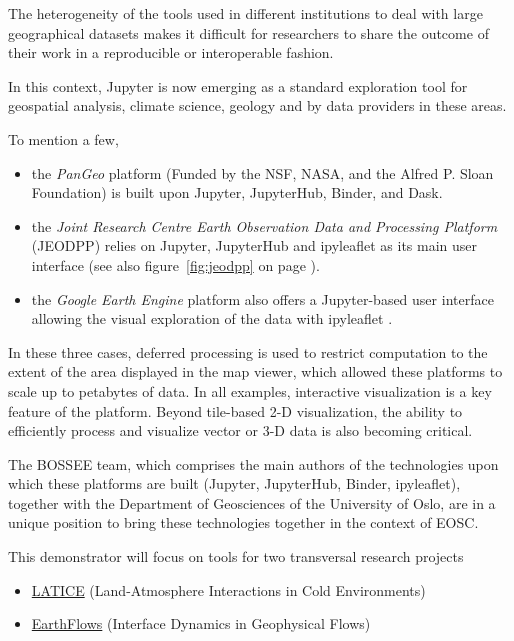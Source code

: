The heterogeneity of the tools used in different institutions to deal with
large geographical datasets makes it difficult for researchers to share the outcome
of their work in a reproducible or interoperable fashion.

In this context, Jupyter is now emerging as a standard exploration tool for
geospatial analysis, climate science, geology and by data providers in these areas.

To mention a few,
\begin{itemize}
\item
   the \emph{PanGeo} platform \cite{Pangeo2018} (Funded by the NSF, NASA, and the
   Alfred P. Sloan Foundation) is built upon Jupyter, JupyterHub, Binder, and Dask.
\item
   the \emph{Joint Research Centre Earth Observation Data and Processing Platform}
   (JEODPP) \cite{Soille2018} relies on Jupyter, JupyterHub and ipyleaflet as
   its main user interface (see also figure~\ref{fig:jeodpp} on page \pageref{fig:jeodpp}).
\item
   the \emph{Google Earth Engine} platform also offers a Jupyter-based user
   interface allowing the visual exploration of the data with ipyleaflet
   \cite{GEEJupyterLeaflet2017}.
\end{itemize}

In these three cases, deferred processing is used to restrict computation to
the extent of the area displayed in the map viewer, which allowed these
platforms to scale up to petabytes of data. In all examples, interactive
visualization is a key feature of the platform. Beyond tile-based
2-D visualization, the ability to efficiently process and visualize vector
or 3-D  data is also becoming critical.

The BOSSEE team, which comprises the main authors of the technologies upon
which these platforms are built (Jupyter, JupyterHub, Binder, ipyleaflet),
together with the Department of Geosciences of the University of Oslo, are
in a unique position to bring these technologies together in the context of
EOSC.

This demonstrator will focus on tools for two transversal research projects

\begin{itemize}
\item \href{https://www.mn.uio.no/geo/english/research/groups/latice/}{LATICE} (Land-Atmosphere Interactions in Cold Environments)
\item \href{https://www.mn.uio.no/geo/english/research/groups/earthflows/}{EarthFlows} (Interface Dynamics in Geophysical Flows)
\end{itemize}

